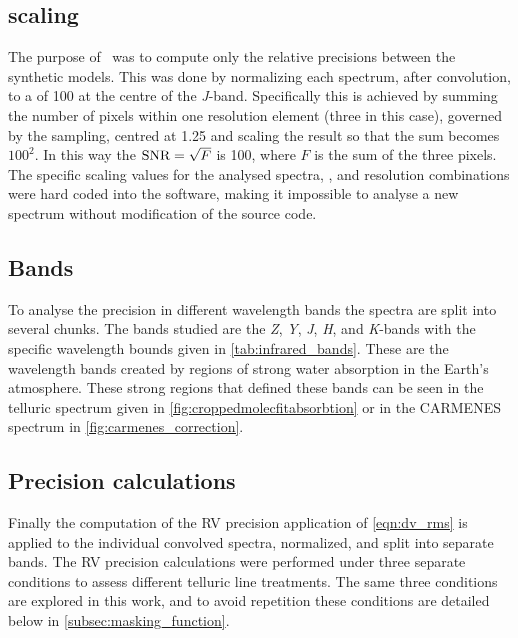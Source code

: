\subsection{\snr{} scaling}
\label{subsec:orginal_snr_scaling}
The purpose of~\citet{figueira_radial_2016} was to compute only the relative precisions between the synthetic models.
This was done by normalizing each spectrum, after convolution, to a \snr{} of 100 at the centre of the \emph{J}-band.
Specifically this is achieved by summing the number of pixels within one resolution element (three in this case), governed by the sampling, centred at 1.25\um{} and scaling the result so that the sum becomes \(100^2\).
In this way the \(\textrm{SNR}{} =\sqrt{F}\) is 100, where \(F\) is the sum of the three pixels.
The specific scaling values for the analysed spectra, \Vsini{}, and resolution combinations were hard coded into the software, making it impossible to analyse a new spectrum without modification of the source code.

\subsection{Bands}
\label{subsec:orginal_bands}
To analyse the precision in different wavelength bands the spectra are split into several chunks.
The bands studied are the \emph{Z}, \emph{Y}, \emph{J}, \emph{H}, and \emph{K}-bands with the specific wavelength bounds given in \cref{tab:infrared_bands}.
These are the \nir{} wavelength bands created by regions of strong water absorption in the Earth's atmosphere.
These strong  regions that defined these bands can be seen in the telluric spectrum given in \cref{fig:croppedmolecfitabsorbtion} or in the {CARMENES} spectrum in \cref{fig:carmenes_correction}.

\subsection{Precision calculations}
\label{subsec:orginal_rv_calc}
Finally the computation of the {RV} precision application of \cref{eqn:dv_rms} is applied to the individual convolved spectra, normalized, and split into separate bands.
The {RV} precision calculations were performed under three separate conditions to assess different telluric line treatments.
The same three conditions are explored in this work, and to avoid repetition these conditions are detailed below in \cref{subsec:masking_function}.

